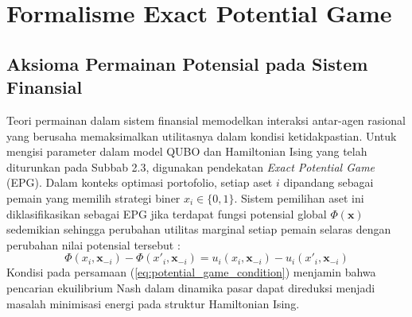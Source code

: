 \section{Formalisme Exact Potential Game}

\subsection{Aksioma Permainan Potensial pada Sistem Finansial}

Teori permainan dalam sistem finansial memodelkan interaksi antar-agen rasional yang berusaha memaksimalkan utilitasnya dalam kondisi ketidakpastian. Untuk mengisi parameter dalam model QUBO dan Hamiltonian Ising yang telah diturunkan pada Subbab 2.3, digunakan pendekatan \textit{Exact Potential Game} (EPG). Dalam konteks optimasi portofolio, setiap aset $i$ dipandang sebagai pemain yang memilih strategi biner $x_i \in \{0, 1\}$. Sistem pemilihan aset ini diklasifikasikan sebagai EPG jika terdapat fungsi potensial global $\Phi(\mathbf{x})$ sedemikian sehingga perubahan utilitas marginal setiap pemain selaras dengan perubahan nilai potensial tersebut \cite{monderer_potential_1996}:
\begin{equation}
\Phi(x_i, \mathbf{x}_{-i}) - \Phi(x'_i, \mathbf{x}_{-i}) = u_i(x_i, \mathbf{x}_{-i}) - u_i(x'_i, \mathbf{x}_{-i})
\label{eq:potential_game_condition}
\end{equation}
Kondisi pada persamaan (\ref{eq:potential_game_condition}) menjamin bahwa pencarian ekuilibrium Nash dalam dinamika pasar dapat direduksi menjadi masalah minimisasi energi pada struktur Hamiltonian Ising.

